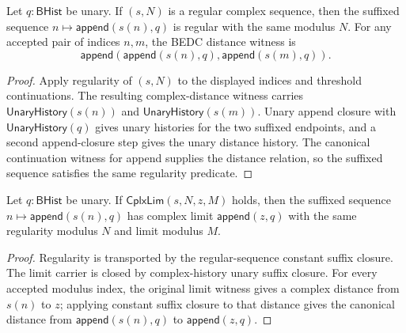 \begin{theorem}
\label{thm:complex-regular-sequence-append-constant-closed}
Let \(q:\mathsf{BHist}\) be unary. If \((s,N)\) is a regular complex sequence,
then the suffixed sequence \(n\mapsto\mathsf{append}(s(n),q)\) is regular with
the same modulus \(N\). For any accepted pair of indices \(n,m\), the BEDC
distance witness is
$$
\mathsf{append}(\mathsf{append}(s(n),q),\mathsf{append}(s(m),q)).
$$
\end{theorem}
\begin{proof}
Apply regularity of \((s,N)\) to the displayed indices and threshold
continuations. The resulting complex-distance witness carries
\(\mathsf{UnaryHistory}(s(n))\) and \(\mathsf{UnaryHistory}(s(m))\). Unary
append closure with \(\mathsf{UnaryHistory}(q)\) gives unary histories for the
two suffixed endpoints, and a second append-closure step gives the unary
distance history. The canonical continuation witness for append supplies the
distance relation, so the suffixed sequence satisfies the same regularity
predicate.
\end{proof}

\begin{theorem}
\label{thm:complex-limit-append-constant-closed}
Let $q:\mathsf{BHist}$ be unary. If $\mathsf{CplxLim}(s,N,z,M)$ holds, then
the suffixed sequence $n\mapsto\mathsf{append}(s(n),q)$ has complex limit
$\mathsf{append}(z,q)$ with the same regularity modulus $N$ and limit modulus
$M$.
\end{theorem}
\begin{proof}
Regularity is transported by the regular-sequence constant suffix closure. The
limit carrier is closed by complex-history unary suffix closure. For every
accepted modulus index, the original limit witness gives a complex distance
from $s(n)$ to $z$; applying constant suffix closure to that distance gives the
canonical distance from $\mathsf{append}(s(n),q)$ to $\mathsf{append}(z,q)$.
\end{proof}

